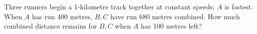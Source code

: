 Three runners begin a 1-kilometre track together at constant speeds; $A$ is fastest. When $A$ has run 400 metres, $B,C$ have run 680 metres combined. How much combined distance remains for $B,C$ when $A$ has 100 metres left?
